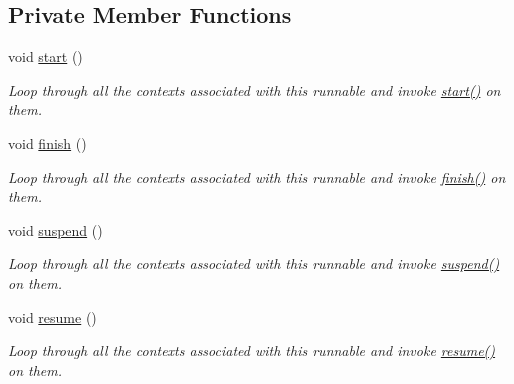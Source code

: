 \subsection*{Private Member Functions}
\begin{DoxyCompactItemize}
\item 
void \hyperlink{structvt_1_1runnable_1_1_runnable_new_adf45fe8ba5154d97455bccd8d8a3e2c9}{start} ()
\begin{DoxyCompactList}\small\item\em Loop through all the contexts associated with this runnable and invoke {\ttfamily \hyperlink{structvt_1_1runnable_1_1_runnable_new_adf45fe8ba5154d97455bccd8d8a3e2c9}{start()}} on them. \end{DoxyCompactList}\item 
void \hyperlink{structvt_1_1runnable_1_1_runnable_new_a44e2f15795876230e49c343b64c1414c}{finish} ()
\begin{DoxyCompactList}\small\item\em Loop through all the contexts associated with this runnable and invoke {\ttfamily \hyperlink{structvt_1_1runnable_1_1_runnable_new_a44e2f15795876230e49c343b64c1414c}{finish()}} on them. \end{DoxyCompactList}\item 
void \hyperlink{structvt_1_1runnable_1_1_runnable_new_aaeb0fefa5654a01600da2e0910f69ca7}{suspend} ()
\begin{DoxyCompactList}\small\item\em Loop through all the contexts associated with this runnable and invoke {\ttfamily \hyperlink{structvt_1_1runnable_1_1_runnable_new_aaeb0fefa5654a01600da2e0910f69ca7}{suspend()}} on them. \end{DoxyCompactList}\item 
void \hyperlink{structvt_1_1runnable_1_1_runnable_new_a4d38f8f4d413457a40f134a57480449d}{resume} ()
\begin{DoxyCompactList}\small\item\em Loop through all the contexts associated with this runnable and invoke {\ttfamily \hyperlink{structvt_1_1runnable_1_1_runnable_new_a4d38f8f4d413457a40f134a57480449d}{resume()}} on them. \end{DoxyCompactList}\end{DoxyCompactItemize}

